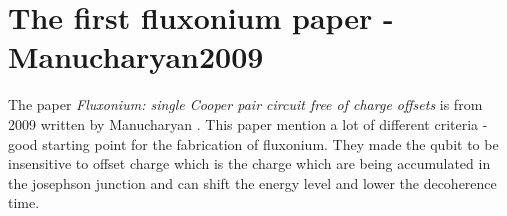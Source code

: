     \section{The first fluxonium paper - Manucharyan2009}
        The paper \textit{Fluxonium: single Cooper pair circuit free of charge offsets} is from 2009 written by Manucharyan \cite{Manucharyan2009}. This paper mention a lot of different criteria - good starting point for the fabrication of fluxonium. They made the qubit to be insensitive to offset charge which is the charge which are being accumulated in the josephson junction and can shift the energy level and lower the decoherence time. 



